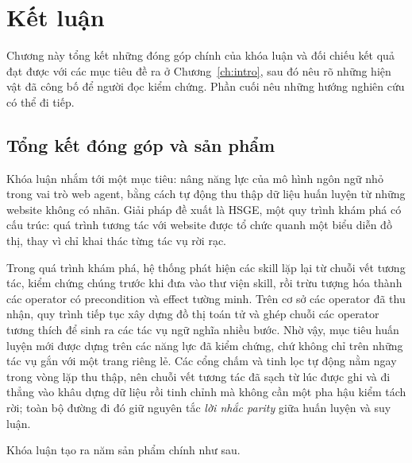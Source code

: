 \chapter{Kết luận}
\label{ch:conclusion}

Chương này tổng kết những đóng góp chính của khóa luận và đối chiếu kết quả
đạt được với các mục tiêu đề ra ở Chương~\ref{ch:intro}, sau đó nêu rõ những
hiện vật đã công bố để người đọc kiểm chứng. Phần cuối nêu những hướng nghiên
cứu có thể đi tiếp.

\section{Tổng kết đóng góp và sản phẩm}
\label{sec:conc-summary}

Khóa luận nhắm tới một mục tiêu: nâng năng lực của mô hình ngôn ngữ nhỏ
trong vai trò web agent, bằng cách tự động thu thập dữ liệu huấn luyện từ
những website không có nhãn. Giải pháp đề xuất là HSGE, một quy trình khám phá
có cấu trúc: quá trình tương tác với website được tổ chức quanh một biểu diễn
đồ thị, thay vì chỉ khai thác từng tác vụ rời rạc.

Trong quá trình khám phá, hệ thống phát hiện các skill lặp lại từ chuỗi vết tương tác,
kiểm chứng chúng trước khi đưa vào thư viện skill, rồi trừu tượng hóa thành
các operator có precondition và effect tường minh. Trên cơ sở các operator
đã thu nhận, quy trình tiếp tục xây dựng đồ thị toán tử và ghép chuỗi các
operator tương thích để sinh ra các tác vụ ngữ nghĩa nhiều bước. Nhờ vậy, mục tiêu huấn luyện mới được dựng trên các năng lực đã kiểm chứng,
chứ không chỉ trên những tác vụ gắn với một trang riêng lẻ. Các cổng chấm và
tinh lọc tự động nằm ngay trong vòng lặp thu thập, nên chuỗi vết tương tác đã sạch từ
lúc được ghi và đi thẳng vào khâu dựng dữ liệu rồi tinh chỉnh mà không cần
một pha hậu kiểm tách rời; toàn bộ đường đi đó giữ nguyên tắc \emph{lời nhắc
parity} giữa huấn luyện và suy luận.

Khóa luận tạo ra năm sản phẩm chính như sau.

